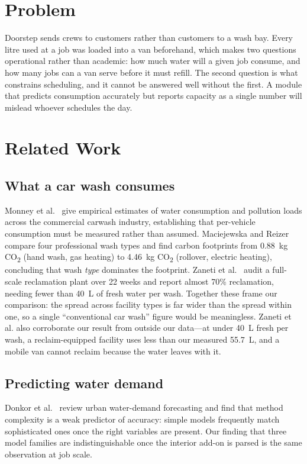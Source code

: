 \documentclass[conference]{IEEEtran}
\begin{document}
\section{Problem}

Doorstep sends crews to customers rather than customers to a wash bay. Every litre used at a
job was loaded into a van beforehand, which makes two questions operational rather than
academic: how much water will a given job consume, and how many jobs can a van serve before
it must refill. The second question is what constrains scheduling, and it cannot be answered
well without the first. A module that predicts consumption accurately but reports capacity as
a single number will mislead whoever schedules the day.

\section{Related Work}

\subsection{What a car wash consumes}
Monney et al.~\cite{monney2020carwash} give empirical estimates of water consumption and
pollution loads across the commercial carwash industry, establishing that per-vehicle
consumption must be measured rather than assumed. Maciejewska and
Reizer~\cite{maciejewska2025carbon} compare four professional wash types and find carbon
footprints from 0.88~kg CO\textsubscript{2} (hand wash, gas heating) to 4.46~kg
CO\textsubscript{2} (rollover, electric heating), concluding that wash \emph{type} dominates
the footprint. Zaneti et al.~\cite{zaneti2013reuse} audit a full-scale reclamation plant over
22 weeks and report almost 70\% reclamation, needing fewer than 40~L of fresh water per wash.
Together these frame our comparison: the spread across facility types is far wider than the
spread within one, so a single ``conventional car wash'' figure would be meaningless.
Zaneti et al. also corroborate our result from outside our data---at under 40~L fresh per
wash, a reclaim-equipped facility uses less than our measured 55.7~L, and a mobile van cannot
reclaim because the water leaves with it.

\subsection{Predicting water demand}
Donkor et al.~\cite{donkor2014demand} review urban water-demand forecasting and find that
method complexity is a weak predictor of accuracy: simple models frequently match
sophisticated ones once the right variables are present. Our finding that three model
families are indistinguishable once the interior add-on is parsed is the same observation at
job scale.
\end{document}
